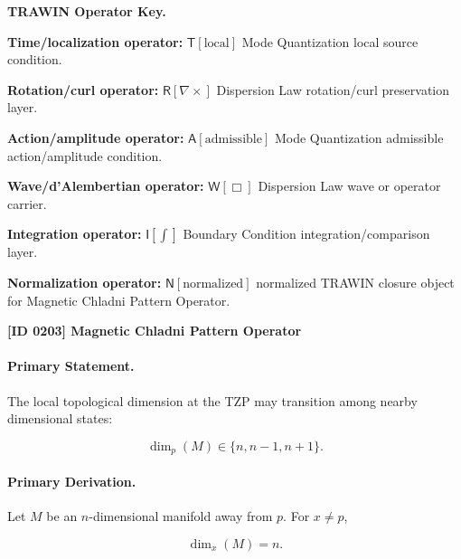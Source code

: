 \par\vspace{0.45\baselineskip}
\noindent\begin{minipage}[t]{\linewidth}
\begingroup
\small
\raggedright
\textbf{TRAWIN Operator Key.}\par
\noindent\textbf{Time/localization operator:} $\mathsf{T}\!\left[\mathrm{local}\right]$ Mode Quantization local source condition.\par
\noindent\textbf{Rotation/curl operator:} $\mathsf{R}\!\left[\nabla\times\right]$ Dispersion Law rotation/curl preservation layer.\par
\noindent\textbf{Action/amplitude operator:} $\mathsf{A}\!\left[\mathrm{admissible}\right]$ Mode Quantization admissible action/amplitude condition.\par
\noindent\textbf{Wave/d'Alembertian operator:} $\mathsf{W}\!\left[\Box\right]$ Dispersion Law wave or operator carrier.\par
\noindent\textbf{Integration operator:} $\mathsf{I}\!\left[\int\right]$ Boundary Condition integration/comparison layer.\par
\noindent\textbf{Normalization operator:} $\mathsf{N}\!\left[\mathrm{normalized}\right]$ normalized TRAWIN closure object for Magnetic Chladni Pattern Operator.\par
\endgroup
\end{minipage}

\clearpage
\noindent\textbf{[ID 0203] Magnetic Chladni Pattern Operator}\par
\vspace{0.35em}
\paragraph{Primary Statement.}
The local topological dimension at the TZP may transition among nearby dimensional states:

\begin{equation}
\dim_p(M)\in\{n,n-1,n+1\}.
\end{equation}

\paragraph{Primary Derivation.}
Let $M$ be an $n$-dimensional manifold away from $p$. For $x\neq p$,

\begin{equation}
\dim_x(M)=n .
\end{equation}

